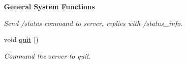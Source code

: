 \begin{Indent}{\bf General System Functions}
\begin{DoxyCompactItemize}
\begin{DoxyCompactList}\small\item\em Send /status command to server, replies with /status\-\_\-info. \end{DoxyCompactList}\item 
\hypertarget{classColliderPlusPlus_1_1Client__Server_ab00723903fd13e9e368cc912c7775c00}{void \hyperlink{classColliderPlusPlus_1_1Client__Server_ab00723903fd13e9e368cc912c7775c00}{quit} ()}\label{classColliderPlusPlus_1_1Client__Server_ab00723903fd13e9e368cc912c7775c00}

\begin{DoxyCompactList}\small\item\em Command the server to quit. \end{DoxyCompactList}\end{DoxyCompactItemize}
\end{Indent}
